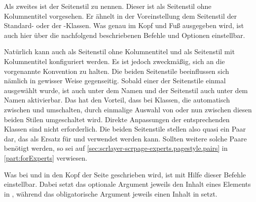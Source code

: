Als zweites ist der Seitenstil
 zu
nennen. Dieser ist als Seitenstil ohne Kolumnentitel vorgesehen. Er ähnelt in
der Voreinstellung dem Seitenstil  der
Standard- oder der \KOMAScript-Klassen. Was genau im Kopf und Fuß ausgegeben
wird, ist auch hier über die nachfolgend beschriebenen Befehle und Optionen
einstellbar.

Natürlich kann auch  als Seitenstil ohne Kolumnentitel
und  als Seitenstil mit Kolumnentitel
konfiguriert werden. Es ist jedoch zweckmäßig, sich an die vorgenannte
Konvention zu halten. Die beiden Seitenstile beeinflussen sich nämlich in
gewisser Weise gegenseitig. Sobald einer der Seitenstile einmal ausgewählt
wurde, ist  auch unter dem Namen
und der Seitenstil  auch unter dem Namen
aktivierbar. Das hat den Vorteil, dass bei Klassen, die automatisch zwischen
 und  umschalten, durch einmalige Auswahl
von  oder  nun zwischen
diesen beiden Stilen umgeschaltet wird. Direkte Anpassungen der entsprechenden
Klassen sind nicht erforderlich. Die beiden Seitenstile stellen also quasi ein
Paar dar, das als Ersatz für  und 
verwendet werden kann. Sollten weitere solche Paare benötigt werden, so sei
auf \autoref{sec:scrlayer-scrpage-experts.pagestyle.pairs} in
\autoref{part:forExperts} verwiesen.%
\EndIndexGroup


\begin{Declaration}
\end{Declaration}
\iffalse%
Was in den Kopf der Seitenstile
\DescRef{\LabelBase.pagestyle.plain.scrheadings} und
\DescRef{\LabelBase.pagestyle.scrheadings} %
\else%
Was bei  und
 in den Kopf der Seite %
\fi%
geschrieben wird, ist mit Hilfe dieser Befehle einstellbar. Dabei setzt das
optionale Argument jeweils den Inhalt eines Elements in
%
\iffalse%
\iffree{}{ beziehungsweise \PageStyle{scrplain}} \fi , während das
obligatorische Argument jeweils einen Inhalt in
 setzt.

